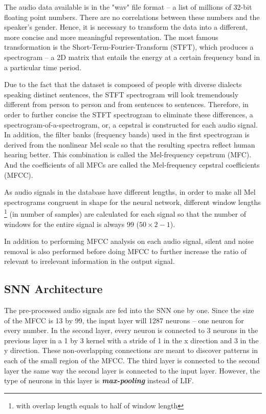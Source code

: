 \documentclass[11pt]{article}  %
\begin{document}
The audio data available is in the "wav" file format -- a list of millions of 32-bit floating point numbers. There are no correlations between these numbers and the speaker's gender. Hence, it is necessary to transform the data into a different, more concise and more meaningful representation. The most famous transformation is the Short-Term-Fourier-Transform (STFT), which produces a spectrogram -- a 2D matrix that entails the energy at a certain frequency band in a particular time period. 

Due to the fact that the dataset is composed of people with diverse dialects speaking distinct sentences, the STFT spectrogram will look tremendously different from person to person and from sentences to sentences. Therefore, in order to further concise the STFT spectrogram to eliminate these differences, a spectrogram-of-a-spectrogram, or, a cepstral is constructed for each audio signal. In addition, the filter banks (frequency bands) used in the first spectrogram is derived from the nonlinear Mel scale \cite{b8} so that the resulting spectra reflect human hearing better. This combination is called the Mel-frequency cepstrum (MFC). And the coefficients of all MFCs are called the Mel-frequency cepstral coefficients (MFCC).


As audio signals in the database have different lengths, in order to make all Mel spectrograms congruent in shape for the neural network, different window lengths \footnote{with overlap length equals to half of window length} (in number of samples) are calculated for each signal so that the number of windows for the entire signal is always 99 ($50\times 2-1$).

In addition to performing MFCC analysis on each audio signal, silent and noise removal is also performed before doing MFCC to further increase the ratio of relevant to irrelevant information in the output signal.

\subsection{SNN Architecture}


The pre-processed audio signals are fed into the SNN one by one. Since the size of the MFCC is 13 by 99, the input layer will 1287 neurons -- one neuron for every number. In the second layer, every neuron is connected to 3 neurons in the previous layer in a 1 by 3 kernel with a stride of 1 in the x direction and 3 in the y direction. These non-overlapping connections are meant to discover patterns in each of the small region of the MFCC. The third layer is connected to the second layer the same way the second layer is connected to the input layer. However, the type of neurons in this layer is \textbf{\textit{max-pooling}} instead of LIF. 
\end{document}
